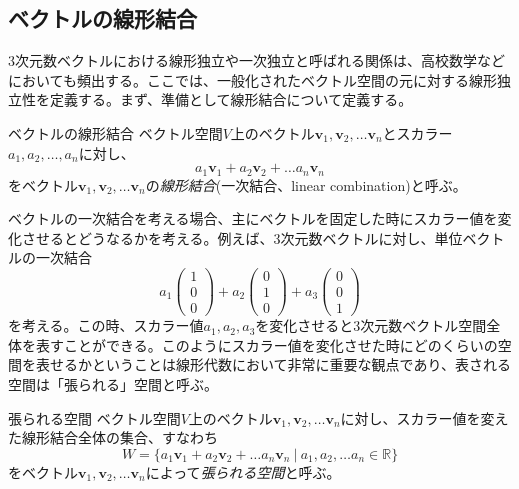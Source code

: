 \subsection{ベクトルの線形結合}
3次元数ベクトルにおける線形独立や一次独立と呼ばれる関係は、高校数学などにおいても頻出する。ここでは、一般化されたベクトル空間の元に対する線形独立性を定義する。まず、準備として線形結合について定義する。
\begin{definition*}{ベクトルの線形結合}
	ベクトル空間\(V\)上のベクトル\(\boldsymbol{v}_1,\boldsymbol{v}_2,\dots\boldsymbol{v}_n\)とスカラー\(a_1,a_2,\dots,a_n\)に対し、
	\begin{equation}
		a_1\boldsymbol{v}_1+a_2\boldsymbol{v}_2+\dots a_n\boldsymbol{v}_n
	\end{equation}
	をベクトル\(\boldsymbol{v}_1,\boldsymbol{v}_2,\dots\boldsymbol{v}_n\)の\emph{線形結合}(一次結合、linear combination)と呼ぶ。
\end{definition*}
ベクトルの一次結合を考える場合、主にベクトルを固定した時にスカラー値を変化させるとどうなるかを考える。例えば、3次元数ベクトルに対し、単位ベクトルの一次結合
\begin{equation}
	a_1 \begin{pmatrix} 1 \\0 \\ 0 \end{pmatrix}+a_2\begin{pmatrix} 0 \\1 \\ 0 \end{pmatrix}+a_3\begin{pmatrix} 0 \\0 \\ 1 \end{pmatrix}
\end{equation}
を考える。この時、スカラー値\(a_1,a_2,a_3\)を変化させると3次元数ベクトル空間全体を表すことができる。このようにスカラー値を変化させた時にどのくらいの空間を表せるかということは線形代数において非常に重要な観点であり、表される空間は「張られる」空間と呼ぶ。
\begin{definition*}{張られる空間}
	ベクトル空間\(V\)上のベクトル\(\boldsymbol{v}_1,\boldsymbol{v}_2,\dots\boldsymbol{v}_n\)に対し、スカラー値を変えた線形結合全体の集合、すなわち
	\begin{equation}
		W=\{a_1\boldsymbol{v}_1+a_2\boldsymbol{v}_2+\dots a_n\boldsymbol{v}_n \ | \  a_1,a_2,\dots a_n \in \mathbb{R}\}
	\end{equation}
	をベクトル\(\boldsymbol{v}_1,\boldsymbol{v}_2,\dots\boldsymbol{v}_n\)によって\emph{張られる空間}と呼ぶ。
\end{definition*}
